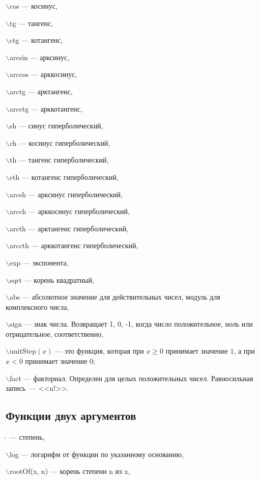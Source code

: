  $\backslash$cos --- косинус, 

 $\backslash$tg --- тангенс, 

 $\backslash$ctg --- котангенс, 

 $\backslash$arcsin --- арксинус, 

 $\backslash$arccos --- арккосинус, 

 $\backslash$arctg --- арктангенс, 

 $\backslash$arcctg --- арккотангенс, 

 $\backslash$sh --- синус гиперболический, 

 $\backslash$ch --- косинус гиперболический, 

 $\backslash$th --- тангенс гиперболический, 

 $\backslash$cth --- котангенс гиперболический, 

 $\backslash$arcsh --- арксинус гиперболический, 

 $\backslash$arcch --- арккосинус гиперболический, 

 $\backslash$arcth --- арктангенс гиперболический, 

 $\backslash$arccth --- арккотангенс гиперболический, 

 $\backslash$exp --- экспонента, 

 $\backslash$sqrt --- корень квадратный, 

 $\backslash$abs --- абсолютное значение для действительных чисел,  модуль для комплексного числа,

 $\backslash$sign --- знак числа. Возвращает 1, 0,  -1,  когда число положительное, ноль или отрицательное,  соответственно,

 $\backslash$unitStep$(x)$ --- это функция, которая при $x\geqslant 0$ принимает значение $1$, а
при $x<0$ принимает значение $0$;

 $\backslash$fact --- факториал.  Определен для целых положительных чисел. Равносильная запись~--- <<n!>>.


\subsection{Функции двух аргументов}

\hspace*{4mm}  $\widehat{\ }{}$ --- степень,

 $\backslash$log --- логарифм от функции по указанному основанию,

 $\backslash$rootOf(x, n) --- корень степени n из x,   

